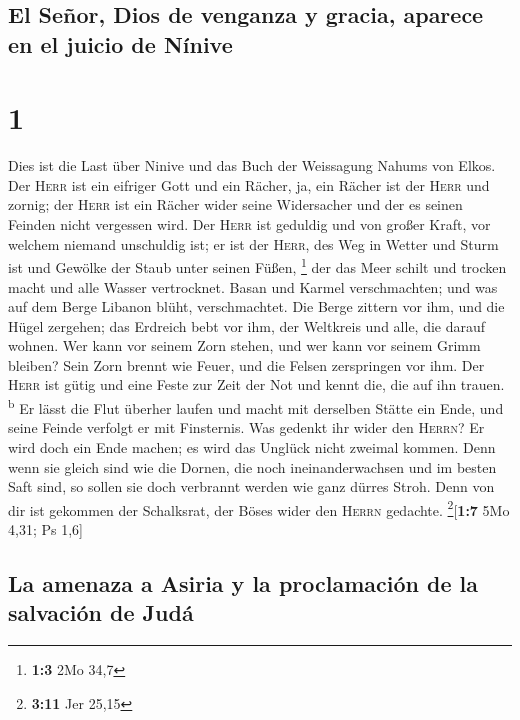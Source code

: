 \hypertarget{el-seuxf1or-dios-de-venganza-y-gracia-aparece-en-el-juicio-de-nuxednive}{%
\subsection{El Señor, Dios de venganza y gracia, aparece en el juicio de
Nínive}\label{el-seuxf1or-dios-de-venganza-y-gracia-aparece-en-el-juicio-de-nuxednive}}

\hypertarget{section}{%
\section{1}\label{section}}

 Dies ist die Last über Ninive und das Buch der Weissagung
Nahums von Elkos.  Der \textsc{Herr} ist ein eifriger Gott
und ein Rächer, ja, ein Rächer ist der \textsc{Herr} und zornig; der
\textsc{Herr} ist ein Rächer wider seine Widersacher und der es seinen
Feinden nicht vergessen wird.  Der \textsc{Herr} ist
geduldig und von großer Kraft, vor welchem niemand unschuldig ist; er
ist der \textsc{Herr}, des Weg in Wetter und Sturm ist und Gewölke der
Staub unter seinen Füßen, \footnote{\textbf{1:3} 2Mo 34,7}
 der das Meer schilt und trocken macht und alle Wasser
vertrocknet. Basan und Karmel verschmachten; und was auf dem Berge
Libanon blüht, verschmachtet.  Die Berge zittern vor ihm,
und die Hügel zergehen; das Erdreich bebt vor ihm, der Weltkreis und
alle, die darauf wohnen.  Wer kann vor seinem Zorn stehen,
und wer kann vor seinem Grimm bleiben? Sein Zorn brennt wie Feuer, und
die Felsen zerspringen vor ihm.  Der \textsc{Herr} ist
gütig und eine Feste zur Zeit der Not und kennt die, die auf ihn trauen.
\textsuperscript{b}  Er lässt die Flut überher laufen und
macht mit derselben Stätte ein Ende, und seine Feinde verfolgt er mit
Finsternis.  Was gedenkt ihr wider den \textsc{Herrn}? Er
wird doch ein Ende machen; es wird das Unglück nicht zweimal kommen.
 Denn wenn sie gleich sind wie die Dornen, die noch
ineinanderwachsen und im besten Saft sind, so sollen sie doch verbrannt
werden wie ganz dürres Stroh.  Denn von dir ist gekommen
der Schalksrat, der Böses wider den \textsc{Herrn} gedachte.
\footnote{\textbf{3:11} Jer 25,15}{[}\textbf{1:7} 5Mo 4,31; Ps 1,6{]}

\hypertarget{la-amenaza-a-asiria-y-la-proclamaciuxf3n-de-la-salvaciuxf3n-de-juduxe1}{%
\subsection{La amenaza a Asiria y la proclamación de la salvación de
Judá}\label{la-amenaza-a-asiria-y-la-proclamaciuxf3n-de-la-salvaciuxf3n-de-juduxe1}}

